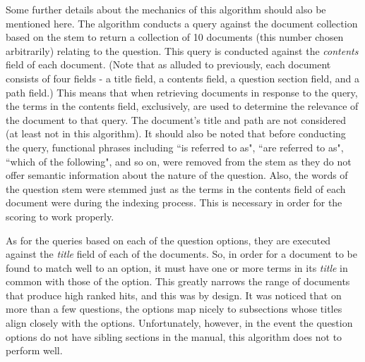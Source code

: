 Some further details about the mechanics of this algorithm should also be mentioned here.  The algorithm conducts a query against the document collection based on the stem to return a collection of 10 documents (this number chosen arbitrarily) relating to the question.  This query is conducted against the \emph{contents} field of each document.  (Note that as alluded to previously, each document consists of four fields - a title field, a contents field, a question section field, and a path field.)  This means that when retrieving documents in response to the query, the terms in the contents field, exclusively, are used to determine the relevance of the document to that query.  The document's title and path are not considered (at least not in this algorithm).  It should also be noted that before conducting the query, functional phrases including ``is referred to as", ``are referred to as", ``which of the following", and so on, were removed from the stem as they do not offer semantic information about the nature of the question.  Also, the words of the question stem were stemmed just as the terms in the contents field of each document were during the indexing process.  This is necessary in order for the scoring to work properly.  

As for the queries based on each of the question options, they are executed against the \emph{title} field of each of the documents.  So, in order for a document to be found to match well to an option, it must have one or more terms in its \emph{title} in common with those of the option.  This greatly narrows the range of documents that produce high ranked hits, and this was by design.  It was noticed that on more than a few questions, the options map nicely to subsections whose titles align closely with the options.  Unfortunately, however, in the event the question options do not have sibling sections in the manual, this algorithm does not to perform well.


